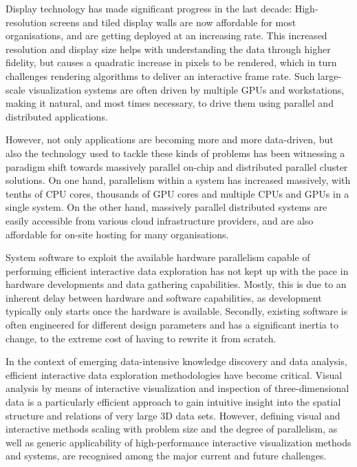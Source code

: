 Display technology has made significant progress in the last decade:
High-resolution screens and tiled display walls are now affordable for most
organisations, and are getting deployed at an increasing rate. This increased
resolution and display size helps with understanding the data through higher
fidelity, but causes a quadratic increase in pixels to be rendered, which in
turn challenges rendering algorithms to deliver an interactive frame rate. Such
large-scale visualization systems are often driven by multiple GPUs and
workstations, making it natural, and most times necessary, to drive them using
parallel and distributed applications.

However, not only applications are becoming more and more data-driven, but also
the technology used to tackle these kinds of problems has been witnessing a
paradigm shift towards massively parallel on-chip and distributed parallel
cluster solutions. On one hand, parallelism within a system has increased
massively, with tenths of CPU cores, thousands of GPU cores and multiple CPUs
and GPUs in a single system. On the other hand, massively parallel distributed
systems are easily accessible from various cloud infrastructure providers, and
are also affordable for on-site hosting for many organisations.

System software to exploit the available hardware parallelism capable of
performing efficient interactive data exploration has not kept up with the pace
in hardware developments and data gathering capabilities. Mostly, this is
due to an inherent delay between hardware and software capabilities, as
development typically only starts once the hardware is available. Secondly,
existing software is often engineered for different design parameters and
has a significant inertia to change, to the extreme cost of having to rewrite
it from scratch.

In the context of emerging data-intensive knowledge discovery and data analysis,
efficient interactive data exploration methodologies have become critical.
Visual analysis by means of interactive visualization and inspection
of three-dimensional data is a particularly efficient approach to gain intuitive
insight into the spatial structure and relations of very large 3D data sets.
However, defining visual and interactive methods scaling with problem size and the
degree of parallelism, as well as generic applicability of high-performance
interactive visualization methods and systems, are recognised among the major
current and future challenges.

